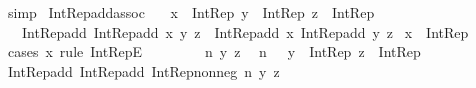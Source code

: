 \begin{isabellebody}
\ simp\isanewline
{}\isamarkupfalse%
%
\endisatagproof
{\isafoldproof}%
%
\isadelimproof
\isanewline
%
\endisadelimproof
\isanewline
{}\isamarkupfalse%
\ Int{\isacharunderscore}{\kern0pt}Rep{\isacharunderscore}{\kern0pt}add{\isacharunderscore}{\kern0pt}assoc{\isacharcolon}{\kern0pt}\isanewline
\ \ \ {\isachardoublequoteopen}x\ {\isacharcolon}{\kern0pt}\ Int{\isacharunderscore}{\kern0pt}Rep{\isachardoublequoteclose}\ {\isachardoublequoteopen}y\ {\isacharcolon}{\kern0pt}\ Int{\isacharunderscore}{\kern0pt}Rep{\isachardoublequoteclose}\ {\isachardoublequoteopen}z\ {\isacharcolon}{\kern0pt}\ Int{\isacharunderscore}{\kern0pt}Rep{\isachardoublequoteclose}\isanewline
\ \ \ {\isachardoublequoteopen}Int{\isacharunderscore}{\kern0pt}Rep{\isacharunderscore}{\kern0pt}add\ {\isacharparenleft}{\kern0pt}Int{\isacharunderscore}{\kern0pt}Rep{\isacharunderscore}{\kern0pt}add\ x\ y{\isacharparenright}{\kern0pt}\ z\ {\isacharequal}{\kern0pt}\ Int{\isacharunderscore}{\kern0pt}Rep{\isacharunderscore}{\kern0pt}add\ x\ {\isacharparenleft}{\kern0pt}Int{\isacharunderscore}{\kern0pt}Rep{\isacharunderscore}{\kern0pt}add\ y\ z{\isacharparenright}{\kern0pt}{\isachardoublequoteclose}\isanewline
%
\isadelimproof
%
\endisadelimproof
%
\isatagproof
{}\isamarkupfalse%
\ {\isacartoucheopen}x\ {\isacharcolon}{\kern0pt}\ Int{\isacharunderscore}{\kern0pt}Rep{\isacartoucheclose}\isanewline
{}\isamarkupfalse%
\ {\isacharparenleft}{\kern0pt}cases\ x\ rule{\isacharcolon}{\kern0pt}\ Int{\isacharunderscore}{\kern0pt}RepE{\isacharparenright}{\kern0pt}\isanewline
\ \ \isacommand{{\isacharbraceleft}{\kern0pt}}\isamarkupfalse%
\isanewline
\ \ \ \ \isamarkupfalse%
\ n\ y\ z\ \isamarkupfalse%
\ {\isachardoublequoteopen}n\ {\isasymin}\ {\isasymnat}{\isachardoublequoteclose}\ {\isachardoublequoteopen}y\ {\isacharcolon}{\kern0pt}\ Int{\isacharunderscore}{\kern0pt}Rep{\isachardoublequoteclose}\ {\isachardoublequoteopen}z\ {\isacharcolon}{\kern0pt}\ Int{\isacharunderscore}{\kern0pt}Rep{\isachardoublequoteclose}\isanewline
\ \ \ \ \isamarkupfalse%
\ \isamarkupfalse%
\ {\isachardoublequoteopen}Int{\isacharunderscore}{\kern0pt}Rep{\isacharunderscore}{\kern0pt}add\ {\isacharparenleft}{\kern0pt}Int{\isacharunderscore}{\kern0pt}Rep{\isacharunderscore}{\kern0pt}add\ {\isacharparenleft}{\kern0pt}Int{\isacharunderscore}{\kern0pt}Rep{\isacharunderscore}{\kern0pt}nonneg\ n{\isacharparenright}{\kern0pt}\ y{\isacharparenright}{\kern0pt}\ z\ {\isacharequal}{\kern0pt}\isanewline

\end{isabellebody}

